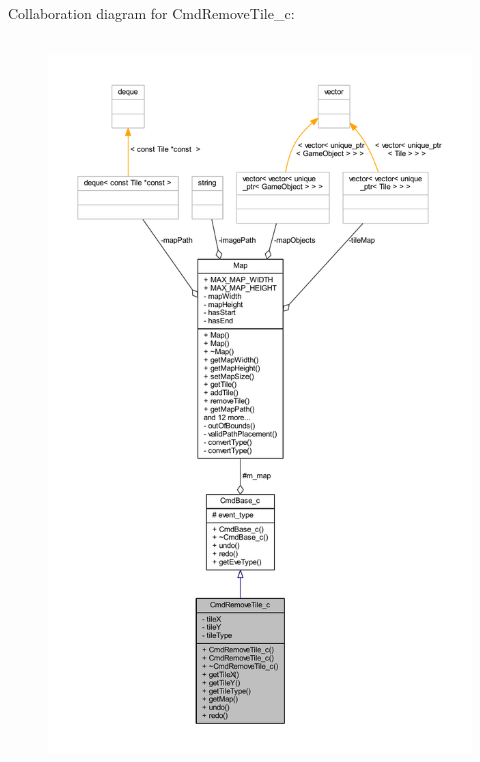 Collaboration diagram for Cmd\+Remove\+Tile\+\_\+c\+:\nopagebreak
\begin{figure}[H]
\begin{center}
\leavevmode
\includegraphics[height=550pt]{class_cmd_remove_tile__c__coll__graph}
\end{center}
\end{figure}
